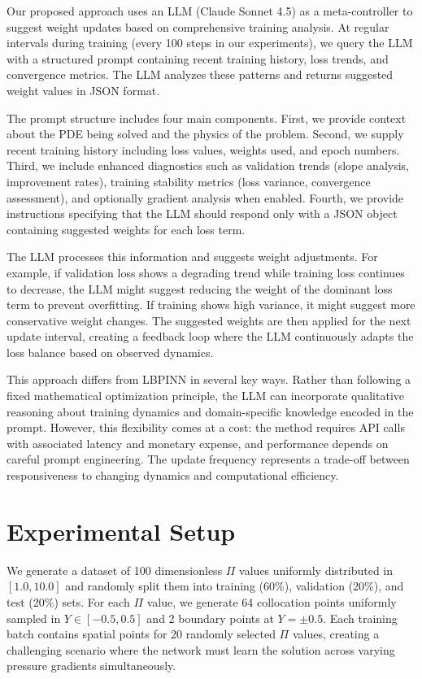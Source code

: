 \documentclass{article}
\begin{document}
Our proposed approach uses an LLM (Claude Sonnet 4.5) as a meta-controller to suggest weight updates based on comprehensive training analysis. At regular intervals during training (every 100 steps in our experiments), we query the LLM with a structured prompt containing recent training history, loss trends, and convergence metrics. The LLM analyzes these patterns and returns suggested weight values in JSON format.

The prompt structure includes four main components. First, we provide context about the PDE being solved and the physics of the problem. Second, we supply recent training history including loss values, weights used, and epoch numbers. Third, we include enhanced diagnostics such as validation trends (slope analysis, improvement rates), training stability metrics (loss variance, convergence assessment), and optionally gradient analysis when enabled. Fourth, we provide instructions specifying that the LLM should respond only with a JSON object containing suggested weights for each loss term.

The LLM processes this information and suggests weight adjustments. For example, if validation loss shows a degrading trend while training loss continues to decrease, the LLM might suggest reducing the weight of the dominant loss term to prevent overfitting. If training shows high variance, it might suggest more conservative weight changes. The suggested weights are then applied for the next update interval, creating a feedback loop where the LLM continuously adapts the loss balance based on observed dynamics.

This approach differs from LBPINN in several key ways. Rather than following a fixed mathematical optimization principle, the LLM can incorporate qualitative reasoning about training dynamics and domain-specific knowledge encoded in the prompt. However, this flexibility comes at a cost: the method requires API calls with associated latency and monetary expense, and performance depends on careful prompt engineering. The update frequency represents a trade-off between responsiveness to changing dynamics and computational efficiency.

\section{Experimental Setup}

We generate a dataset of 100 dimensionless $\Pi$ values uniformly distributed in $[1.0, 10.0]$ and randomly split them into training (60\%), validation (20\%), and test (20\%) sets. For each $\Pi$ value, we generate 64 collocation points uniformly sampled in $Y \in [-0.5, 0.5]$ and 2 boundary points at $Y = \pm 0.5$. Each training batch contains spatial points for 20 randomly selected $\Pi$ values, creating a challenging scenario where the network must learn the solution across varying pressure gradients simultaneously.
\end{document}
